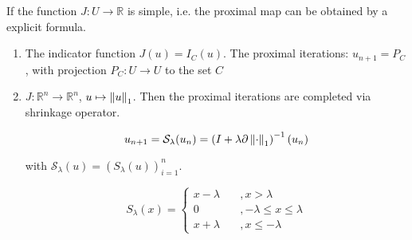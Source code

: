 \begin{example}
	If the function $J:U\rightarrow \mathbb{R}$ is simple, i.e. the proximal map can be obtained by a explicit formula. 
	\begin{enumerate}
		\item The indicator function $J(u)=I_C(u)$. The proximal iterations: $u_{n+1}=P_C$, with projection $P_C:U\rightarrow U$ to the set $C$
		\item $J:\mathbb{R}^n \rightarrow \mathbb{R}^n$, $u\mapsto \left\lVert u\right\rVert_1$. Then the proximal iterations are completed via shrinkage operator.
		
		\begin{equation}
			u_{n+1} = \mathcal{S}_\lambda (u_n) = \left(I+\lambda \partial \left\lVert\cdot\right\rVert_1\right)^{-1} (u_n)
		\end{equation}
		
		with $\mathcal{S}_\lambda (u) = (S_\lambda(u))^n_{i=1} $.
		
		\begin{equation}
			S_\lambda(x)=\left\lbrace\begin{array}{ll}
			x-\lambda &\quad, x>\lambda \\
			0 &\quad , -\lambda \leq x \leq \lambda \\
			x+\lambda &\quad, x \leq -\lambda
			\end{array}\right.
		\end{equation}
	\end{enumerate}
\end{example}